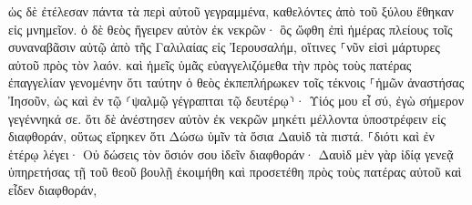 \documentclass{openreader}
\begin{document}
ὡς δὲ ἐτέλεσαν πάντα τὰ περὶ αὐτοῦ γεγραμμένα, καθελόντες ἀπὸ τοῦ ξύλου ἔθηκαν εἰς μνημεῖον. 
ὁ δὲ θεὸς ἤγειρεν αὐτὸν ἐκ νεκρῶν· 
ὃς ὤφθη ἐπὶ ἡμέρας πλείους τοῖς συναναβᾶσιν αὐτῷ ἀπὸ τῆς Γαλιλαίας εἰς Ἰερουσαλήμ, οἵτινες ⸀νῦν εἰσὶ μάρτυρες αὐτοῦ πρὸς τὸν λαόν. 
καὶ ἡμεῖς ὑμᾶς εὐαγγελιζόμεθα τὴν πρὸς τοὺς πατέρας ἐπαγγελίαν γενομένην 
ὅτι ταύτην ὁ θεὸς ἐκπεπλήρωκεν τοῖς τέκνοις ⸀ἡμῶν ἀναστήσας Ἰησοῦν, ὡς καὶ ἐν τῷ ⸂ψαλμῷ γέγραπται τῷ δευτέρῳ⸃· Υἱός μου εἶ σύ, ἐγὼ σήμερον γεγέννηκά σε. 
ὅτι δὲ ἀνέστησεν αὐτὸν ἐκ νεκρῶν μηκέτι μέλλοντα ὑποστρέφειν εἰς διαφθοράν, οὕτως εἴρηκεν ὅτι Δώσω ὑμῖν τὰ ὅσια Δαυὶδ τὰ πιστά. 
⸀διότι καὶ ἐν ἑτέρῳ λέγει· Οὐ δώσεις τὸν ὅσιόν σου ἰδεῖν διαφθοράν· 
Δαυὶδ μὲν γὰρ ἰδίᾳ γενεᾷ ὑπηρετήσας τῇ τοῦ θεοῦ βουλῇ ἐκοιμήθη καὶ προσετέθη πρὸς τοὺς πατέρας αὐτοῦ καὶ εἶδεν διαφθοράν, 
\end{document}
